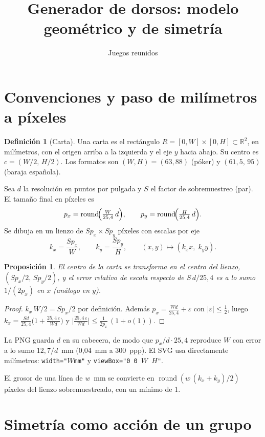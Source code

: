 \documentclass[11pt,a4paper]{article}
\title{Generador de dorsos: modelo geométrico y de simetría}
\author{Juegos reunidos}
\date{}
\theoremstyle{definition}
\newtheorem{definicion}{Definición}[section]
\theoremstyle{plain}
\newtheorem{proposicion}{Proposición}[section]
\theoremstyle{remark}
\newcommand{\R}{\mathbb{R}}
\begin{document}
\maketitle

\section{Convenciones y paso de milímetros a píxeles}

\begin{definicion}[Carta]
Una carta es el rectángulo $R=[0,W]\times[0,H]\subset\R^2$, en milímetros, con el
origen arriba a la izquierda y el eje $y$ hacia abajo. Su centro es
$c=(W/2,\,H/2)$. Los formatos son $(W,H)=(63,88)$ (póker) y $(61{,}5,\,95)$
(baraja española).
\end{definicion}

Sea $d$ la resolución en puntos por pulgada y $S$ el factor de sobremuestreo
(par). El tamaño final en píxeles es
\[
  p_x=\operatorname{round}\!\Bigl(\tfrac{W}{25{,}4}\,d\Bigr),\qquad
  p_y=\operatorname{round}\!\Bigl(\tfrac{H}{25{,}4}\,d\Bigr).
\]
Se dibuja en un lienzo de $Sp_x\times Sp_y$ píxeles con escalas por eje
\[
  k_x=\frac{Sp_x}{W},\qquad k_y=\frac{Sp_y}{H},\qquad (x,y)\mapsto(k_xx,\;k_yy).
\]

\begin{proposicion}\label{prop:centro}
El centro de la carta se transforma en el centro del lienzo, $(Sp_x/2,\,Sp_y/2)$,
y el error relativo de escala respecto de $S\,d/25{,}4$ es a lo sumo $1/(2p_x)$
en $x$ (análogo en $y$).
\end{proposicion}
\begin{proof}
$k_x\,W/2=Sp_x/2$ por definición. Además $p_x=\tfrac{W d}{25{,}4}+\varepsilon$
con $|\varepsilon|\le\tfrac12$, luego $k_x=\tfrac{S d}{25{,}4}\bigl(1+\tfrac{25{,}4\,\varepsilon}{Wd}\bigr)$
y $\bigl|\tfrac{25{,}4\,\varepsilon}{Wd}\bigr|\le\tfrac{1}{2p_x}\,(1+o(1))$.
\end{proof}

La PNG guarda $d$ en su cabecera, de modo que $p_x/d\cdot25{,}4$ reproduce $W$ con
error a lo sumo $12{,}7/d$~mm (0,04~mm a 300~ppp). El SVG usa directamente
milímetros: \texttt{width="$W$mm"} y \texttt{viewBox="0 0 $W$ $H$"}.

El grosor de una línea de $w$~mm se convierte en $\operatorname{round}(w\,(k_x+k_y)/2)$
píxeles del lienzo sobremuestreado, con un mínimo de 1.

\section{Simetría como acción de un grupo}
\end{document}

